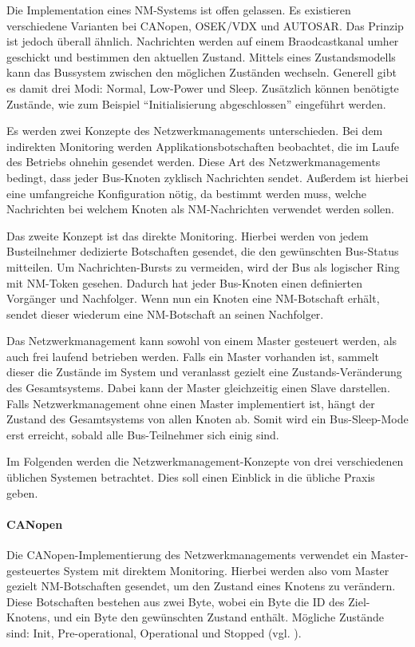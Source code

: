 \documentclass[
  a4paper,					    %
  twoside,
  DIV=calc,     				%
  bibliography=totoc,
  cleardoublepage=empty,
  ngerman,     					%
  final       					%
]{scrbook}
\begin{document}
Die Implementation eines NM-Systems ist offen gelassen. Es existieren verschiedene Varianten bei CANopen, OSEK/VDX und AUTOSAR. Das Prinzip ist jedoch überall ähnlich. Nachrichten werden auf einem Braodcastkanal umher geschickt und bestimmen den aktuellen Zustand. Mittels eines Zustandsmodells kann das Bussystem zwischen den möglichen Zuständen wechseln. Generell gibt es damit drei Modi: Normal, Low-Power und Sleep. Zusätzlich können benötigte Zustände, wie zum Beispiel "`Initialisierung abgeschlossen"' eingeführt werden.

Es werden zwei Konzepte des Netzwerkmanagements unterschieden. Bei dem indirekten Monitoring werden Applikationsbotschaften beobachtet, die im Laufe des Betriebs ohnehin gesendet werden. Diese Art des Netzwerkmanagements bedingt, dass jeder Bus-Knoten zyklisch Nachrichten sendet. Außerdem ist hierbei eine umfangreiche Konfiguration nötig, da bestimmt werden muss, welche Nachrichten bei welchem Knoten als NM-Nachrichten verwendet werden sollen.

Das zweite Konzept ist das direkte Monitoring. Hierbei werden von jedem Busteilnehmer dedizierte Botschaften gesendet, die den gewünschten Bus-Sta\-tus mitteilen. Um Nachrichten-Bursts zu vermeiden, wird der Bus als logischer Ring mit NM-Token gesehen. Dadurch hat jeder Bus-Knoten einen definierten Vorgänger und Nachfolger. Wenn nun ein Knoten eine NM-Botschaft erhält, sendet dieser wiederum eine NM-Botschaft an seinen Nachfolger.

Das Netzwerkmanagement kann sowohl von einem Master gesteuert werden, als auch frei laufend betrieben werden. Falls ein Master vorhanden ist, sammelt dieser die Zustände im System und veranlasst gezielt eine Zu\-stands-Ver\-än\-de\-rung des Gesamtsystems. Dabei kann der Master gleichzeitig einen Slave darstellen. Falls Netzwerkmanagement ohne einen Master implementiert ist, hängt der Zustand des Gesamtsystems von allen Knoten ab. Somit wird ein Bus-Sleep-Mode erst erreicht, sobald alle Bus-Teilnehmer sich einig sind.

Im Folgenden werden die Netzwerkmanagement-Konzepte von drei verschiedenen üblichen Systemen betrachtet. Dies soll einen Einblick in die übliche Praxis geben.

\paragraph{CANopen}
Die CANopen-Implementierung des Netzwerkmanagements verwendet ein Master-gesteuertes System mit direktem Monitoring. Hierbei werden also vom Master gezielt NM-Botschaften gesendet, um den Zustand eines Knotens zu verändern. Diese Botschaften bestehen aus zwei Byte, wobei ein Byte die ID des Ziel-Knotens, und ein Byte den gewünschten Zustand enthält. Mögliche Zustände sind: Init, Pre-operational, Operational und Stopped (vgl. \cite{nm_canopen}\cite{wiki:canopen}).
\end{document}
